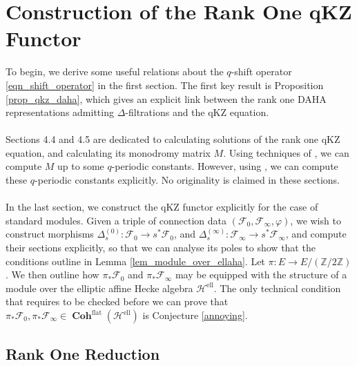 \documentclass[a4paper]{report}
\theoremstyle{theorem}
\theoremstyle{definition}
\theoremstyle{remark}
\theoremstyle{proposition}
\theoremstyle{conjecture}
\theoremstyle{lemma}
\theoremstyle{corollary}
\theoremstyle{exercise}
\theoremstyle{example}
\newcommand{\mcal}{\mathcal}
\newcommand{\on}{\operatorname}
\newcommand{\coh}{\on{\mathbf{Coh}}}
\begin{document}
  \chapter{Construction of the Rank One qKZ Functor}\label{chap4}
  
  To begin, we derive some 
  useful relations about the $q$-shift operator \eqref{eqn_shift_operator} in 
  the first section. 
  The first key result is Proposition \ref{prop_qkz_daha},
  which gives an explicit link between the rank one DAHA representations
  admitting $\Delta$-filtrations and the qKZ equation.\\\\
  Sections 4.4 and 4.5 are dedicated to calculating solutions of the rank one qKZ equation,
  and calculating its monodromy matrix $M$. Using techniques of \cite{sauloy03}, we can compute 
  $M$ up to some $q$-periodic constants. However, using \cite{efk98}, we can compute these 
  $q$-periodic constants explicitly. No originality is claimed in these sections.\\\\
  In the last section, we construct the qKZ functor explicitly for the case of standard modules.
  Given a triple of connection data $(\mcal{F}_0, \mcal{F}_\infty, \varphi)$, we wish 
  to construct morphisms $\Delta_s^{(0)} : \mcal{F}_0 \to s^\ast\mcal{F}_0$, and 
  $\Delta_s^{(\infty)} : \mcal{F}_\infty \to s^\ast\mcal{F}_\infty$, and compute 
  their sections explicitly, so that we can analyse its poles to show that the conditions outline in
  Lemma \ref{lem_module_over_ellaha}. Let $\pi : E \to E/(\mathbb{Z}/2\mathbb{Z})$.
  We then outline how $\pi_\ast\mcal{F}_0$ and $\pi_\ast\mcal{F}_\infty$ may be equipped with the structure of a module over 
  the elliptic affine Hecke algebra $\mcal{H}^{\on{ell}}$. The only technical condition that requires to be checked 
  before we can prove that $\pi_\ast\mcal{F}_0,\pi_\ast\mcal{F}_\infty \in \coh^{\on{flat}}(\mcal{H}^{\on{ell}})$ 
  is Conjecture \ref{annoying}.
  
  \section{Rank One Reduction}
  
\end{document}
